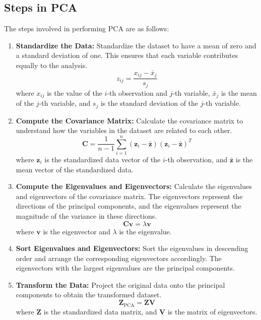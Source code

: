 \documentclass{article}
\begin{document}
\subsection{Steps in PCA}
The steps involved in performing PCA are as follows:
\begin{enumerate}
    \item \textbf{Standardize the Data:} Standardize the dataset to have a mean of zero and a standard deviation of one. This ensures that each variable contributes equally to the analysis.
    \[
    z_{ij} = \frac{x_{ij} - \bar{x}_j}{s_j}
    \]
    where \(x_{ij}\) is the value of the \(i\)-th observation and \(j\)-th variable, \(\bar{x}_j\) is the mean of the \(j\)-th variable, and \(s_j\) is the standard deviation of the \(j\)-th variable.

    \item \textbf{Compute the Covariance Matrix:} Calculate the covariance matrix to understand how the variables in the dataset are related to each other.
    \[
    \mathbf{C} = \frac{1}{n-1} \sum_{i=1}^{n} (\mathbf{z}_i - \bar{\mathbf{z}})(\mathbf{z}_i - \bar{\mathbf{z}})^T
    \]
    where \(\mathbf{z}_i\) is the standardized data vector of the \(i\)-th observation, and \(\bar{\mathbf{z}}\) is the mean vector of the standardized data.

    \item \textbf{Compute the Eigenvalues and Eigenvectors:} Calculate the eigenvalues and eigenvectors of the covariance matrix. The eigenvectors represent the directions of the principal components, and the eigenvalues represent the magnitude of the variance in these directions.
    \[
    \mathbf{C} \mathbf{v} = \lambda \mathbf{v}
    \]
    where \(\mathbf{v}\) is the eigenvector and \(\lambda\) is the eigenvalue.

    \item \textbf{Sort Eigenvalues and Eigenvectors:} Sort the eigenvalues in descending order and arrange the corresponding eigenvectors accordingly. The eigenvectors with the largest eigenvalues are the principal components.

    \item \textbf{Transform the Data:} Project the original data onto the principal components to obtain the transformed dataset.
    \[
    \mathbf{Z}_{\text{PCA}} = \mathbf{Z} \mathbf{V}
    \]
    where \(\mathbf{Z}\) is the standardized data matrix, and \(\mathbf{V}\) is the matrix of eigenvectors.

\end{enumerate}
\end{document}

